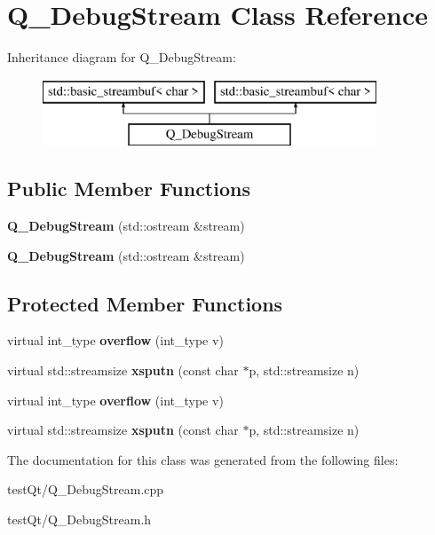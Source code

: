 \hypertarget{class_q___debug_stream}{}\section{Q\+\_\+\+Debug\+Stream Class Reference}
\label{class_q___debug_stream}
Inheritance diagram for Q\+\_\+\+Debug\+Stream\+:\begin{figure}[H]
\begin{center}
\leavevmode
\includegraphics[height=2.000000cm]{class_q___debug_stream}
\end{center}
\end{figure}
\subsection*{Public Member Functions}
\begin{DoxyCompactItemize}
\item 
\hypertarget{class_q___debug_stream_a34eaae6399620da13cac980c4b10bea4}{}\label{class_q___debug_stream_a34eaae6399620da13cac980c4b10bea4} 
{\bfseries Q\+\_\+\+Debug\+Stream} (std\+::ostream \&stream)
\item 
\hypertarget{class_q___debug_stream_a34eaae6399620da13cac980c4b10bea4}{}\label{class_q___debug_stream_a34eaae6399620da13cac980c4b10bea4} 
{\bfseries Q\+\_\+\+Debug\+Stream} (std\+::ostream \&stream)
\end{DoxyCompactItemize}
\subsection*{Protected Member Functions}
\begin{DoxyCompactItemize}
\item 
\hypertarget{class_q___debug_stream_aeface8c7f01a29d55142c36ff7600d29}{}\label{class_q___debug_stream_aeface8c7f01a29d55142c36ff7600d29} 
virtual int\+\_\+type {\bfseries overflow} (int\+\_\+type v)
\item 
\hypertarget{class_q___debug_stream_a46def7b89b4f656eed40a6b3f9f76324}{}\label{class_q___debug_stream_a46def7b89b4f656eed40a6b3f9f76324} 
virtual std\+::streamsize {\bfseries xsputn} (const char $\ast$p, std\+::streamsize n)
\item 
\hypertarget{class_q___debug_stream_aeface8c7f01a29d55142c36ff7600d29}{}\label{class_q___debug_stream_aeface8c7f01a29d55142c36ff7600d29} 
virtual int\+\_\+type {\bfseries overflow} (int\+\_\+type v)
\item 
\hypertarget{class_q___debug_stream_a46def7b89b4f656eed40a6b3f9f76324}{}\label{class_q___debug_stream_a46def7b89b4f656eed40a6b3f9f76324} 
virtual std\+::streamsize {\bfseries xsputn} (const char $\ast$p, std\+::streamsize n)
\end{DoxyCompactItemize}


The documentation for this class was generated from the following files\+:\begin{DoxyCompactItemize}
\item 
test\+Qt/Q\+\_\+\+Debug\+Stream.\+cpp\item 
test\+Qt/Q\+\_\+\+Debug\+Stream.\+h\end{DoxyCompactItemize}
